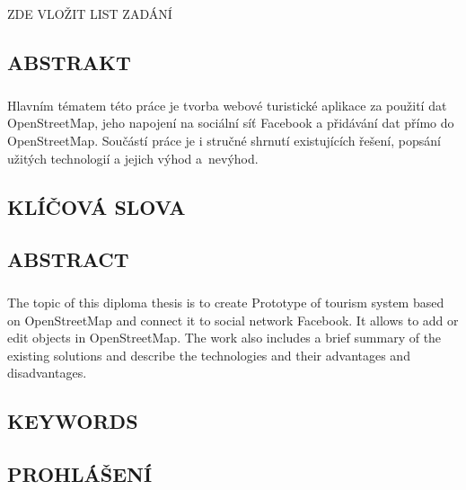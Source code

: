 \documentclass[11pt,a4paper,titlepage,oneside]{book}
\begin{document}
\newpage %
	\begin{center}
		\vspace*{15cm}
		{\Large ZDE VLOŽIT LIST ZADÁNÍ}
	\end{center}

\begin{flushleft}
	\chapter*{}
	\section*{ABSTRAKT}
	\paragraph{} Hlavním tématem této práce je tvorba webové turistické aplikace za použití dat OpenStreetMap, jeho napojení na sociální síť Facebook a přidávání dat přímo do OpenStreetMap. Součástí práce je i stručné shrnutí existujících řešení, popsání užitých technologií a jejich výhod a~nevýhod.
	\section*{KLÍČOVÁ SLOVA}
	{}
	\section*{ABSTRACT}
	\paragraph{} The topic of this diploma thesis is to create Prototype of tourism system based on OpenStreetMap and connect it to social network Facebook. It allows to add or edit objects in OpenStreetMap. The work also includes a brief summary of the existing solutions and describe the technologies and their advantages and disadvantages.
	\section*{KEYWORDS}
	{}
\end{flushleft}

\newpage %
	\vspace*{15cm}
	\section*{\Large PROHLÁŠENÍ}
\end{document}
